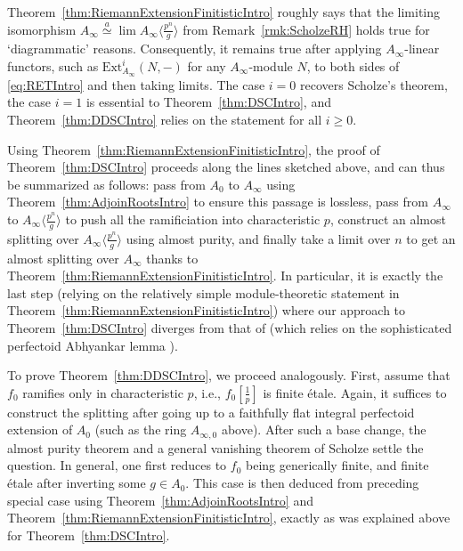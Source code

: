 \documentclass[10pt,reqno]{amsart}
\begin{document}
\begin{remark}
Theorem~\ref{thm:RiemannExtensionFinitisticIntro} roughly says that the limiting isomorphism $A_\infty \stackrel{a}{\simeq} \lim A_\infty \langle \frac{p^n}{g} \rangle$ from Remark~\ref{rmk:ScholzeRH} holds true for  `diagrammatic' reasons. Consequently, it remains true after applying $A_\infty$-linear functors, such as $\mathrm{Ext}^i_{A_\infty}(N,-)$ for any $A_\infty$-module $N$, to both sides of \eqref{eq:RETIntro} and then taking limits. The case $i=0$ recovers Scholze's theorem, the case $i=1$ is essential to Theorem~\ref{thm:DSCIntro}, and Theorem~\ref{thm:DDSCIntro} relies on the statement for all $i \geq 0$.
\end{remark}


Using Theorem~\ref{thm:RiemannExtensionFinitisticIntro}, the proof of Theorem~\ref{thm:DSCIntro} proceeds along the lines sketched above, and can thus be summarized as follows: pass from $A_0$ to $A_\infty$ using Theorem~\ref{thm:AdjoinRootsIntro} to ensure this passage is lossless, pass from $A_\infty$ to $A_\infty \langle \frac{p^n}{g} \rangle$ to push all the ramificiation into characteristic $p$, construct an almost splitting over $A_\infty \langle \frac{p^n}{g} \rangle$ using almost purity, and finally take a limit over $n$ to get an almost splitting over $A_\infty$ thanks to Theorem~\ref{thm:RiemannExtensionFinitisticIntro}. In particular, it is exactly the last step (relying on the relatively simple module-theoretic statement in Theorem~\ref{thm:RiemannExtensionFinitisticIntro}) where our approach to Theorem~\ref{thm:DSCIntro} diverges from that of \cite{AndreDSC} (which relies on the  sophisticated perfectoid Abhyankar lemma \cite{AndrePAL}).

To prove Theorem~\ref{thm:DDSCIntro}, we  proceed analogously. First, assume that $f_0$ ramifies only in characteristic $p$, i.e., $f_0[\frac{1}{p}]$ is finite \'etale. Again, it suffices to construct the splitting after going up to a faithfully flat integral perfectoid extension of $A_0$ (such as the ring $A_{\infty,0}$ above). After such a base change, the almost purity theorem and a general vanishing theorem of Scholze settle the question. In general, one first reduces to $f_0$ being generically finite, and finite \'etale after inverting some $g \in A_0$. This case is then deduced from preceding special case using Theorem~\ref{thm:AdjoinRootsIntro} and Theorem~\ref{thm:RiemannExtensionFinitisticIntro}, exactly as was explained above for Theorem~\ref{thm:DSCIntro}. 
\end{document}

